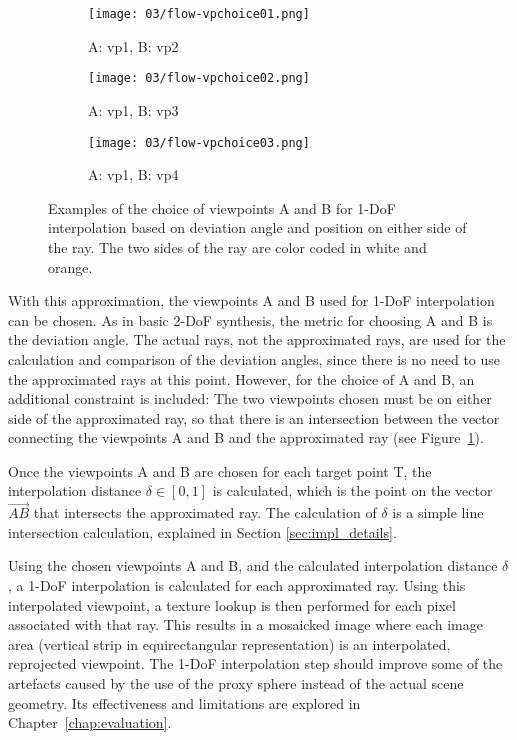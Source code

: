 \begin{figure}
\centering
    \hfill
    \begin{subfigure}[t]{0.3\textwidth}
            \centering
            \texttt{[image: 03/flow-vpchoice01.png]}
            \caption{A: vp1, B: vp2}
    \end{subfigure}%
    \hfill
    \begin{subfigure}[t]{0.3\textwidth}
            \centering
            \texttt{[image: 03/flow-vpchoice02.png]}
            \caption{A: vp1, B: vp3}
    \end{subfigure}
    \hfill
    \begin{subfigure}[t]{0.3\textwidth}
            \centering
            \texttt{[image: 03/flow-vpchoice03.png]}
            \caption{A: vp1, B: vp4}
    \end{subfigure}%
    \hfill
    \hfill
  \caption[Examples of the choice of viewpoints A and B for 1-DoF interpolation]{Examples of the choice of viewpoints A and B for 1-DoF interpolation based on deviation angle and position on either side of the ray. The two sides of the ray are color coded in white and orange.} \label{fig:flow_vpchoice}
\end{figure}

With this approximation, the viewpoints A and B used for 1-DoF interpolation can be chosen. As in basic 2-DoF synthesis, the metric for choosing A and B is the deviation angle. The actual rays, not the approximated rays, are used for the calculation and comparison of the deviation angles, since there is no need to use the approximated rays at this point. However, for the choice of A and B, an additional constraint is included: The two viewpoints chosen must be on either side of the approximated ray, so that there is an intersection between the vector connecting the viewpoints A and B and the approximated ray (see Figure~\ref{fig:flow_vpchoice}).

Once the viewpoints A and B are chosen for each target point T, the interpolation distance $\delta \in [0,1]$ is calculated, which is the point on the vector $\overrightarrow{AB}$ that intersects the approximated ray. The calculation of $\delta$ is a simple line intersection calculation, explained in Section \ref{sec:impl_details}.

Using the chosen viewpoints A and B, and the calculated interpolation distance $\delta$, a 1-DoF interpolation is calculated for each approximated ray. Using this interpolated viewpoint, a texture lookup is then performed for each pixel associated with that ray. This results in a mosaicked image where each image area (vertical strip in equirectangular representation) is an interpolated, reprojected viewpoint. The 1-DoF interpolation step should improve some of the artefacts caused by the use of the proxy sphere instead of the actual scene geometry. Its effectiveness and limitations are explored in Chapter~\ref{chap:evaluation}.

